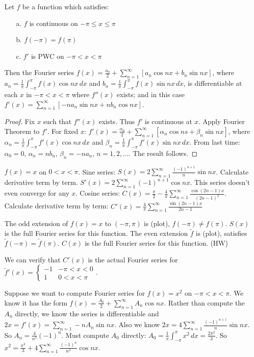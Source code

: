 \documentclass[]{article}
\begin{document}
\begin{theorem}
	Let $f$ be a function which satisfies:
	\begin{itemize}
		\item[a.] $f$ is continuous on $-\pi\leq x\leq \pi$
		\item[b.] $f(-\pi)=f(\pi)$
		\item[c.] $f'$ is PWC on $-\pi<x<\pi$
	\end{itemize}
	Then the Fourier series $f(x)=\frac{a_0}{2} + \sum_{n=1}^\infty [a_n\cos{nx} + b_n\sin{nx}]$, where $a_n=\frac{1}{\pi}\int_{-\pi}^\pi f(x) \cos{nx} \, dx$ and $b_n = \frac{1}{\pi} \int_{-\pi}^\pi f(x) \sin{nx}\, dx$, is differentiable at each $x$ in $-\pi<x<\pi$ where $f''(x)$ exists; and in this case $f'(x) = \sum_{n=1}^\infty [-na_n\sin{nx} + nb_n\cos{nx}]$.
\end{theorem}
\begin{proof}
	Fix $x$ such that $f''(x)$ exists. Thus $f'$ is continuous at $x$. Apply Fourier Theorem to $f'$.
	For fixed $x$: $f'(x)=\frac{\alpha_0}{2} + \sum_{n=1}^\infty [\alpha_n \cos{ns} + \beta_n\sin{nx}]$, where $\alpha_n = \frac{1}{\pi}\int_{-\pi}^\pi f'(x) \cos{nx}\, dx$ and $\beta_n = \frac{1}{\pi}\int_{-\pi}^\pi f'(x) \sin{nx} \, dx$.
	From last time: $\alpha_0 = 0$, $\alpha_n = nb_n$, $\beta_n = -na_n$, $n=1,2,\dots$. The result follows.
\end{proof}
\begin{example}
	$f(x) = x$ on $0<x<\pi$. 
	Sine series: $S(x) = 2\sum_{n=1}^\infty \frac{(-1)^{n+1}}{n}\sin{nx}$. Calculate derivative term by term. $S'(x) = 2\sum_{n=1}^\infty (-1)^{n+1} \cos{nx}$. This series doesn't even converge for any $x$.
	Cosine series: $C(x) = \frac{\pi}{2} - \frac{4}{\pi} \sum_{n=1}^\infty \frac{\cos{(2n-1)x}}{(2n-1)^2}$. Calculate derivative term by term: $C'(x) = \frac{4}{\pi} \sum_{n=1}^\infty \frac{\sin{(2n-1)x}}{2n-1}$
	\begin{note}
		The odd extension of $f(x) = x$ to $(-\pi,\pi)$ is (plot), $f(-\pi)\neq f(\pi)$. $S(x)$ is the full Fourier series for this function. The even extension $\tilde{f}$ is (plot), satisfies $\tilde{f}(-\pi)=\tilde{f}(\pi)$. $C(x)$ is the full Fourier series for this function. (HW)
	\end{note}
	We can verify that $C'(x)$ is the actual Fourier series for $\tilde{f}'(x) = \begin{cases} -1 & -\pi<x<0 \\ 1 & 0<x<\pi \end{cases}$.
\end{example}
\begin{example}
	Suppose we want to compute Fourier series for $f(x)=x^2$ on $-\pi<x<\pi$. We know it has the form $f(x) = \frac{A_0}{2} + \sum_{n=1}^\infty A_n\cos{nx}$. Rather than compute the $A_n$ directly, we know the series is differentiable and $2x = f'(x) = \sum_{n=1}^\infty -nA_n\sin{nx}$.
	Also we know $2x = 4\sum_{n=1}^\infty \frac{(-1)^{n+1}}{n}\sin{nx}$. So $A_n = \frac{4}{n^2}(-1)^n$.
	Must compute $A_0$ directly: $A_0 = \frac{1}{\pi}\int_{-\pi}^\pi x^2\, dx = \frac{2\pi^2}{3}$. So $x^2 = \frac{\pi^2}{3} + 4\sum_{n=1}^\infty \frac{(-1)^n}{n^2}\cos{nx}$.
\end{example}
\end{document}
